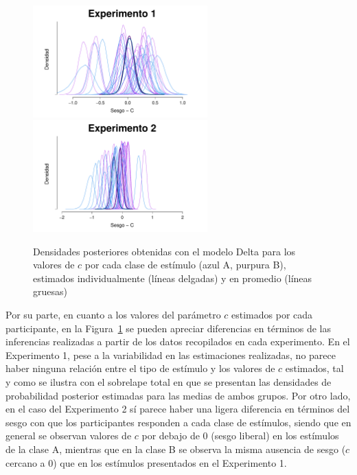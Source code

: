 \begin{figure}[th]
\centering
\includegraphics[width=0.6\textwidth]{Figures/MDelta_Cbias_E1}\\
\includegraphics[width=0.6\textwidth]{Figures/MDelta_Cbias_E2}\\
\caption[Modelo Delta: Densidades posteriores de los valores de $c$ estimados individualmente y en promedio, por cada experimento]{Densidades posteriores obtenidas con el modelo Delta para los valores de $c$ por cada clase de estímulo (azul A, purpura B), estimados individualmente (líneas delgadas) y en promedio (líneas gruesas)}
\label{fig:Delta_Cbias}
\end{figure}

Por su parte, en cuanto a los valores del parámetro $c$ estimados por cada participante, en la Figura~\ref{fig:Delta_Cbias} se pueden apreciar diferencias en términos de las inferencias realizadas a partir de los datos recopilados en cada experimento. En el Experimento 1, pese a la variabilidad en las estimaciones realizadas, no parece haber ninguna relación entre el tipo de estímulo y los valores de $c$ estimados, tal y como se ilustra con el sobrelape total en que se presentan las densidades de probabilidad posterior estimadas para las medias de ambos grupos. Por otro lado, en el caso del Experimento 2 sí parece haber una ligera diferencia en términos del sesgo con que los participantes responden a cada clase de estímulos, siendo que en general se observan valores de $c$ por debajo de 0 (sesgo liberal) en los estímulos de la clase A, mientras que en la clase B se observa la misma ausencia de sesgo ($c$ cercano a $0$) que en los estímulos presentados en el Experimento 1.\\


